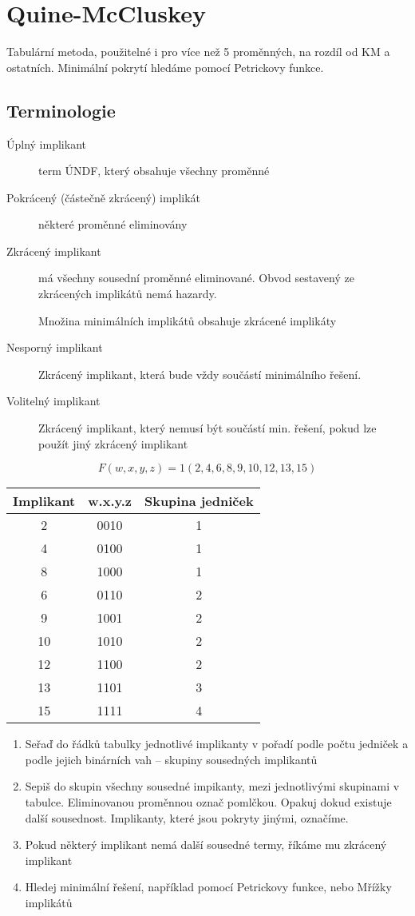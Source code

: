 \documentclass[a4paper, 11pt]{report}
\begin{document}
\section{Quine-McCluskey}

Tabulární metoda, použitelné i pro více než 5 proměnných, na rozdíl od KM a ostatních. Minimální pokrytí hledáme pomocí Petrickovy funkce.

\subsection{Terminologie}
\begin{description}
	\item[Úplný implikant] term ÚNDF, který obsahuje všechny proměnné
	\item[Pokrácený (částečně zkrácený) implikát] některé proměnné eliminovány
	\item[Zkrácený implikant] má všechny sousední proměnné eliminované. Obvod sestavený ze zkrácených implikátů nemá hazardy.
	\item[] Množina minimálních implikátů obsahuje zkrácené implikáty
	\item[Nesporný implikant] Zkrácený implikant, která bude vždy součástí minimálního řešení.
	\item[Volitelný implikant] Zkrácený implikant, který nemusí být součástí min. řešení, pokud lze použít jiný zkrácený implikant
\end{description}

$$F(w,x,y,z) = 1(2,4,6,8,9,10,12,13,15)$$
\begin{tabular}{ | c | c | c |}
	\hline
	Implikant & w.x.y.z & Skupina jedniček \\ \hline
	2	& 0010	& 1 \\ \hline
	4	& 0100	& 1 \\ \hline
	8	& 1000	& 1 \\ \hline
	6	& 0110	& 2 \\ \hline
	9	& 1001	& 2 \\ \hline
	10	& 1010	& 2 \\ \hline
	12	& 1100	& 2 \\ \hline
	13	& 1101	& 3 \\ \hline
	15	& 1111	& 4 \\ \hline
\end{tabular}

\begin{enumerate}
	\item Seřaď do řádků tabulky jednotlivé implikanty v pořadí podle počtu jedniček a podle jejich binárních vah -- skupiny sousedných implikantů
	\item Sepiš do skupin všechny sousedné impikanty, mezi jednotlivými skupinami v tabulce. Eliminovanou proměnnou označ pomlčkou. Opakuj dokud existuje další sousednost. Implikanty, které jsou pokryty jinými, označíme.
	\item Pokud některý implikant nemá další sousedné termy, říkáme mu zkrácený implikant
	\item Hledej minimální řešení, například pomocí Petrickovy funkce, nebo Mřížky implikátů
\end{enumerate}
\end{document}
